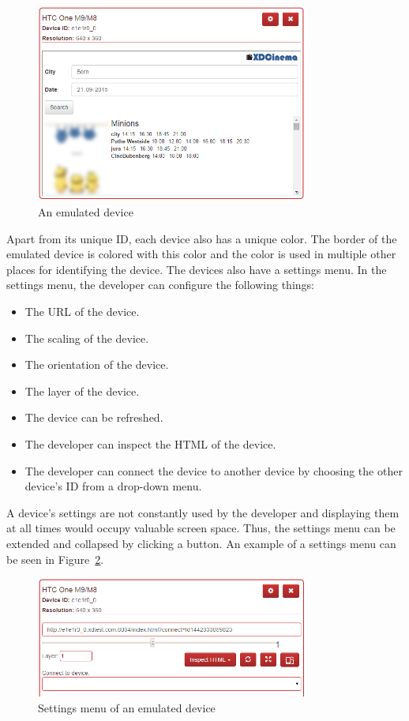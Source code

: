 \begin{figure}[H]
  \centering
    \includegraphics[width=0.8\textwidth]{images/screenshots/emulated_device_3.png}
	\caption[Screenshot: Emulated device]{An emulated device}
	\label{fig:emulated_device}
\end{figure}

Apart from its unique ID, each device also has a unique color. The border of the emulated device is colored with this color and the color is used in multiple other places for identifying the device. The devices also have a settings menu. In the settings menu, the developer can configure the following things:
\begin{itemize}
	\item The URL of the device.
	\item The scaling of the device.
	\item The orientation of the device.
	\item The layer of the device. 
	\item The device can be refreshed.
	\item The developer can inspect the HTML of the device.
	\item The developer can connect the device to another device by choosing the other device's ID from a drop-down menu.
\end{itemize}
A device's settings are not constantly used by the developer and displaying them at all times would occupy valuable screen space. Thus, the settings menu can be extended and collapsed by clicking a button. An example of a settings menu can be seen in Figure~\ref{fig:settings_menu}. 

\begin{figure}[H]
  \centering
    \includegraphics[width=0.8\textwidth]{images/screenshots/settings_menu_2.png}
	\caption[Screenshot: Settings menu emulated device]{Settings menu of an emulated device}
	\label{fig:settings_menu}
\end{figure}

